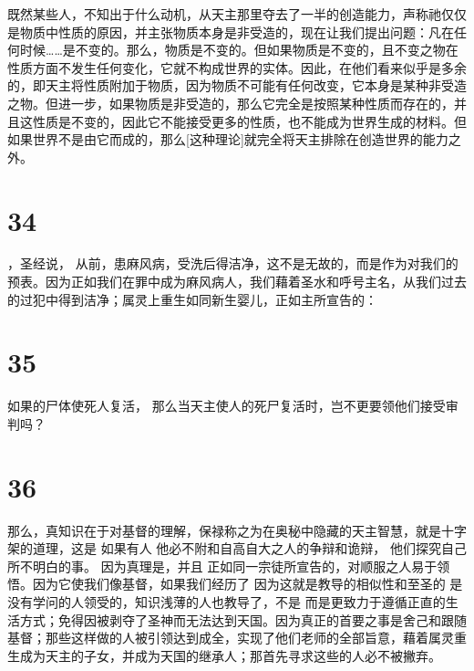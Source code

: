 既然某些人，不知出于什么动机，从天主那里夺去了一半的创造能力，声称祂仅仅是物质中性质的原因，并主张物质本身是非受造的，现在让我们提出问题：凡在任何时候……是不变的。那么，物质是不变的。但如果物质是不变的，且不变之物在性质方面不发生任何变化，它就不构成世界的实体。因此，在他们看来似乎是多余的，即天主将性质附加于物质，因为物质不可能有任何改变，它本身是某种非受造之物。但进一步，如果物质是非受造的，那么它完全是按照某种性质而存在的，并且这性质是不变的，因此它不能接受更多的性质，也不能成为世界生成的材料。但如果世界不是由它而成的，那么[这种理论]就完全将天主排除在创造世界的能力之外。\par


\section{34}

，圣经说， 从前，患麻风病，受洗后得洁净，这不是无故的，而是作为对我们的预表。因为正如我们在罪中成为麻风病人，我们藉着圣水和呼号主名，从我们过去的过犯中得到洁净；属灵上重生如同新生婴儿，正如主所宣告的：\par


\section{35}

如果的尸体使死人复活， 那么当天主使人的死尸复活时，岂不更要领他们接受审判吗？\par


\section{36}

那么，真知识在于对基督的理解，保禄称之为在奥秘中隐藏的天主智慧，就是十字架的道理，这是 如果有人 他必不附和自高自大之人的争辩和诡辩， 他们探究自己所不明白的事。 因为真理是，并且 正如同一宗徒所宣告的，对顺服之人易于领悟。因为它使我们像基督，如果我们经历了 因为这就是教导的相似性和至圣的 是没有学问的人领受的，知识浅薄的人也教导了，不是 而是更致力于遵循正直的生活方式；免得因被剥夺了圣神而无法达到天国。因为真正的首要之事是舍己和跟随基督；那些这样做的人被引领达到成全，实现了他们老师的全部旨意，藉着属灵重生成为天主的子女，并成为天国的继承人；那首先寻求这些的人必不被撇弃。\par

